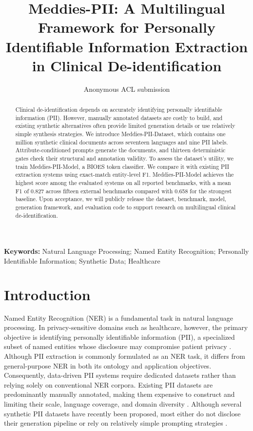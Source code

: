 \documentclass[11pt]{article}
\begin{document}
\title{Meddies-PII: A Multilingual Framework for Personally Identifiable Information Extraction in Clinical De-identification}

\author{Anonymous ACL submission}

\maketitle



\begin{abstract}
Clinical de-identification depends on accurately identifying personally identifiable information (PII). However, manually annotated datasets are costly to build, and existing synthetic alternatives often provide limited generation details or use relatively simple synthesis strategies. We introduce Meddies-PII-Dataset, which contains one million synthetic clinical documents across seventeen languages and nine PII labels. Attribute-conditioned prompts generate the documents, and thirteen deterministic gates check their structural and annotation validity. To assess the dataset's utility, we train Meddies-PII-Model, a BIOES token classifier. We compare it with existing PII extraction systems using exact-match entity-level F1. Meddies-PII-Model achieves the highest score among the evaluated systems on all reported benchmarks, with a mean F1 of 0.827 across fifteen external benchmarks compared with 0.658 for the strongest baseline. Upon acceptance, we will publicly release the dataset, benchmark, model, generation framework, and evaluation code to support research on multilingual clinical de-identification.
\end{abstract}

\noindent\textbf{Keywords:} Natural Language Processing; Named Entity Recognition; Personally Identifiable Information; Synthetic Data; Healthcare\par\medskip

\section{Introduction}

Named Entity Recognition (NER) is a fundamental task in natural language processing. In privacy-sensitive domains such as healthcare, however, the primary objective is identifying personally identifiable information (PII), a specialized subset of named entities whose disclosure may compromise patient privacy \cite{savkin-etal-2025-spy}. Although PII extraction is commonly formulated as an NER task, it differs from general-purpose NER in both its ontology and application objectives. Consequently, data-driven PII systems require dedicated datasets rather than relying solely on conventional NER corpora. Existing PII datasets are predominantly manually annotated, making them expensive to construct and limiting their scale, language coverage, and domain diversity \cite{neamatullah2008automated,uzuner2007evaluating,stubbs2015automated}. Although several synthetic PII datasets have recently been proposed, most either do not disclose their generation pipeline or rely on relatively simple prompting strategies \cite{ai4privacy_openpii_1_5m_2026,gretel-pii-docs-en-v1,nemotron-pii}.
\end{document}
